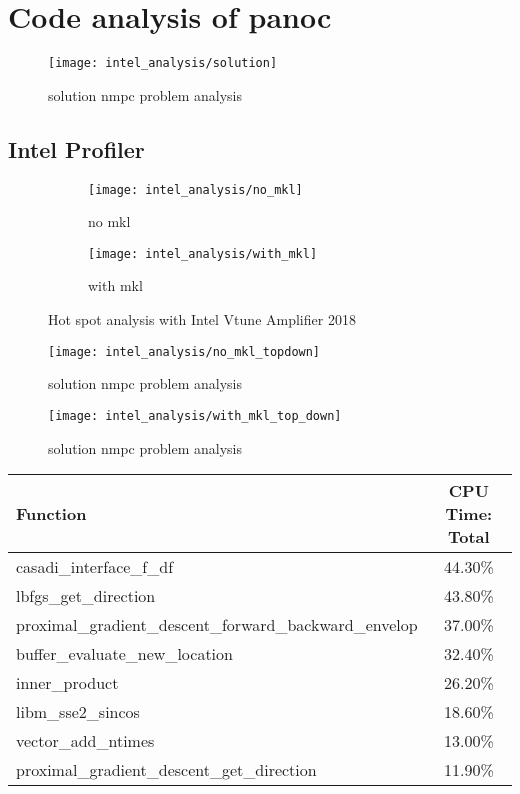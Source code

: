 \chapter{Code analysis of panoc}



\begin{figure}[H]
	\centering
	\texttt{[image: intel\_analysis/solution]}
	\caption{solution nmpc problem analysis}
	\label{fig:solution nmpc problem analysis}
\end{figure}

\section{Intel Profiler}

\begin{figure}[H]
	\centering
	\begin{subfigure}[b]{0.45\textwidth}
		\centering
		\texttt{[image: intel\_analysis/no\_mkl]}
		\caption{no mkl}
		\label{fig:hotspot no mkl}
	\end{subfigure}
	\hfill
	\begin{subfigure}[b]{0.45\textwidth}
		\centering
		\texttt{[image: intel\_analysis/with\_mkl]}
		\caption{with mkl}
		\label{fig:hotspot with mkl}
	\end{subfigure}
	\caption{Hot spot analysis with Intel Vtune Amplifier 2018}
\end{figure}

\begin{figure}[H]
	\centering
	\texttt{[image: intel\_analysis/no\_mkl\_topdown]}
	\caption{solution nmpc problem analysis}
	\label{fig:no mkl top down}
\end{figure}
\begin{figure}[H]
	\centering
	\texttt{[image: intel\_analysis/with\_mkl\_top\_down]}
	\caption{solution nmpc problem analysis}
	\label{fig:with mkl top down}
\end{figure}



\begin{center}
	\begin{tabular}{| l | c |}
		\hline
		Function&CPU Time: Total \\
		\hline
		casadi\_interface\_f\_df & 44.30\%\\
		lbfgs\_get\_direction & 43.80\% \\
		proximal\_gradient\_descent\_forward\_backward\_envelop & 37.00\%\\
		buffer\_evaluate\_new\_location & 32.40\%\\
		inner\_product & 26.20\%\\
		libm\_sse2\_sincos & 18.60\%\\
		vector\_add\_ntimes & 13.00\%\\
		proximal\_gradient\_descent\_get\_direction & 11.90\%\\
		\hline
	\end{tabular}
\end{center}

